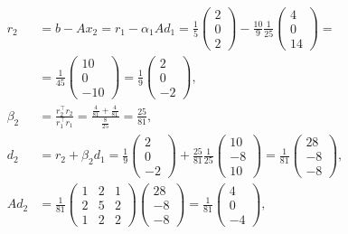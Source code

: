 \documentclass[english, parskip=full]{scrartcl}
\begin{document}
\begin{align}
r_2 &= b - Ax_2 = r_1 - \alpha_1Ad_1 = \frac{1}{5}\begin{pmatrix}
2 \\ 0 \\ 2
\end{pmatrix} - \frac{10}{9}\frac{1}{25} \begin{pmatrix}
4 \\ 0 \\ 14
\end{pmatrix} = \\
&= \frac{1}{45}\begin{pmatrix}
10 \\ 0 \\ -10
\end{pmatrix} = \frac{1}{9}\begin{pmatrix}
2 \\ 0 \\ -2
\end{pmatrix},\\
\beta_2 &= \frac{r_2^\top r_2}{r_1^\top r_1} = \frac{\frac{4}{81} + \frac{4}{81}}{\frac{8}{25}} = \frac{25}{81},\\
d_2 &= r_2 + \beta_2d_1 = \frac{1}{9}\begin{pmatrix}
2 \\ 0 \\ -2
\end{pmatrix} + \frac{25}{81} \frac{1}{25}\begin{pmatrix}
10 \\ -8 \\ 10
\end{pmatrix} = \frac{1}{81}\begin{pmatrix}
28 \\ -8 \\ -8
\end{pmatrix},\\
Ad_2 &= \frac{1}{81}\begin{pmatrix}
1 & 2 & 1 \\ 2 & 5 & 2 \\ 1 & 2 & 2
\end{pmatrix} \begin{pmatrix}
28 \\ -8 \\ -8
\end{pmatrix} = \frac{1}{81} \begin{pmatrix}
4 \\ 0 \\ -4
\end{pmatrix},\\

\end{align}
\end{document}
